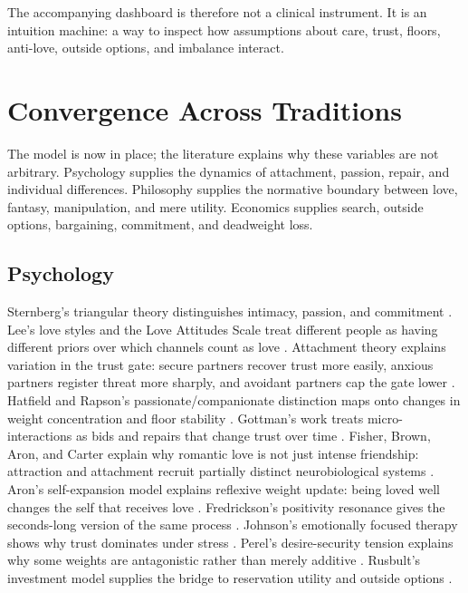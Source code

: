 \documentclass[11pt]{article}
\begin{document}
The accompanying dashboard is therefore not a clinical instrument. It is an intuition machine: a way to inspect how assumptions about care, trust, floors, anti-love, outside options, and imbalance interact.

\section{Convergence Across Traditions}
The model is now in place; the literature explains why these variables are not arbitrary. Psychology supplies the dynamics of attachment, passion, repair, and individual differences. Philosophy supplies the normative boundary between love, fantasy, manipulation, and mere utility. Economics supplies search, outside options, bargaining, commitment, and deadweight loss.

\subsection{Psychology}
Sternberg's triangular theory distinguishes intimacy, passion, and commitment \citep{sternberg1986,sternberg1996}. Lee's love styles and the Love Attitudes Scale treat different people as having different priors over which channels count as love \citep{lee1973,hendrick1986}. Attachment theory explains variation in the trust gate: secure partners recover trust more easily, anxious partners register threat more sharply, and avoidant partners cap the gate lower \citep{bowlby1969,ainsworth1978,hazan1987,bartholomew1991,mikulincer2007}. Hatfield and Rapson's passionate/companionate distinction maps onto changes in weight concentration and floor stability \citep{hatfield1978,berscheid2010}. Gottman's work treats micro-interactions as bids and repairs that change trust over time \citep{gottman1999,gottman2011}. Fisher, Brown, Aron, and Carter explain why romantic love is not just intense friendship: attraction and attachment recruit partially distinct neurobiological systems \citep{fisher1998,aron2005,acevedo2012,carter1998}. Aron's self-expansion model explains reflexive weight update: being loved well changes the self that receives love \citep{aron1986,aron2022}. Fredrickson's positivity resonance gives the seconds-long version of the same process \citep{fredrickson2013}. Johnson's emotionally focused therapy shows why trust dominates under stress \citep{johnson2019}. Perel's desire-security tension explains why some weights are antagonistic rather than merely additive \citep{perel2006}. Rusbult's investment model supplies the bridge to reservation utility and outside options \citep{rusbult1980,rusbult1998}.
\end{document}
